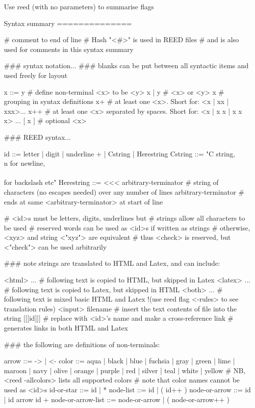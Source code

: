 Use reed (with no parameters) to summarise flags

Syntax summary
==============

# comment to end of line
# Hash "<#>" is used in REED files
# and is also used for comments in this syntax summary

### syntax notation...
### blanks can be put between all syntactic items and used freely for layout 

x ::= y # define non-terminal <x> to be <y>
x | y   # <x> or <y>
{ x }   # grouping in syntax definitions
x+      # at least one <x>. Short for: <x | xx | xxx>...
x++     # at least one <x> separated by spaces. Short for: <x | x x | x x x> ... 
[ x ]   # optional <x>

### REED syntax...

id ::= { letter | digit | underline }+ | Cstring | Herestring
Cstring ::= "C string, \\n for newline, \\\\ for backslash etc" 
Herestring ::= <<< arbitrary-terminator
               # string of characters (no escapes needed) over any number of lines
arbitrary-terminator 
               # ends at same <arbitrary-terminator> at start of line

# <id>s must be letters, digits, underlines but
# strings allow all characters to be used
# reserved words can be used as <id>s if written as strings
# otherwise, <xyz> and string <"xyz"> are equivalent
# thus <check> is reserved, but <"check"> can be used arbitrarily

### note strings are translated to HTML and Latex, and can include:

<html> ...        # following text is copied to HTML, but skipped in Latex
<latex> ...       # following text is copied to Latex, but skipped in HTML
<both> ...        # following text is mixed basic HTML and Latex !(use reed flag <-rules> to see translation rules)
<input> filename  # insert the text contents of file into the string
[[[id]]]          # replace with <id>'s name and make a cross-reference link 
                  # generates links in both HTML and Latex

### the following are definitions of non-terminals:

arrow ::= -> | <- 
color ::= aqua | black | blue | fuchsia | gray | green
        | lime | maroon | navy | olive | orange | purple
        | red | silver | teal | white | yellow
        # NB, <reed -allcolors> lists all supported colors
        # note that color names cannot be used as <id>s
id-or-star ::= id | *
node-list ::= id | ( id++ )
node-or-arrow ::= id | id { arrow id }+
node-or-arrow-list ::= node-or-arrow | ( node-or-arrow++ )

